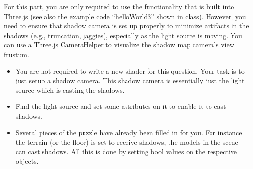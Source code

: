 \documentclass[12pt]{exam}
\begin{document}
\begin{enumerate}
For this part, you are only required to use the functionality that is built into Three.js (see also the example code ``helloWorld3'' shown in class). However, you need to ensure that shadow camera is set up properly to minimize artifacts in the shadows (e.g., truncation, jaggies), especially as the light source is moving. You can use a Three.js CameraHelper to visualize the shadow map camera's view frustum.

\begin{itemize}
    \item You are not required to write a new shader for this question. Your task is to just setup a shadow camera. This shadow camera is essentially just the light source which is casting the shadows.
    \item Find the light source and set some attributes on it to enable it to cast shadows.
    \item Several pieces of the puzzle have already been filled in for you. For instance the terrain (or the floor) is set to receive shadows, the models in the scene can cast shadows. All this is done by setting bool values on the respective objects.
\end{itemize}






\end{enumerate}
\end{document}
